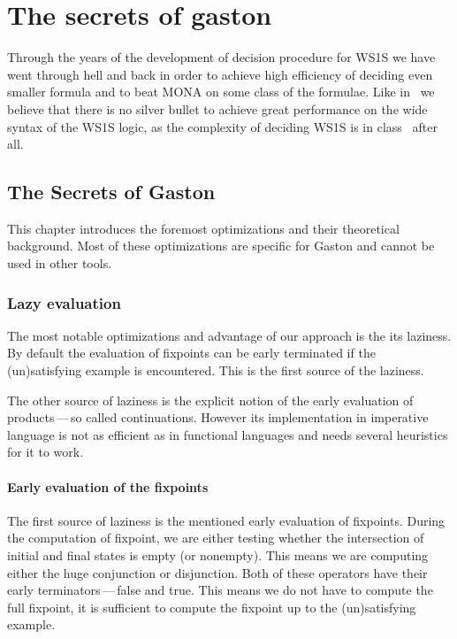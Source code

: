  
\chapter{The secrets of gaston}
\begin{intro}
Through the years of the development of decision procedure for WS1S we 
have went through hell and back in order to achieve high efficiency
of deciding even smaller formula and to beat MONA on some class of the
formulae. Like in~\cite{mona:secrets} we believe that there is no silver
bullet to achieve great performance on the wide syntax of the WS1S logic,
as the complexity of deciding WS1S is in \nonelementary 
class~\cite{ws1s:nonelementary} after all.
\end{intro}

\section{The Secrets of Gaston}

This chapter introduces the foremost optimizations and their theoretical background. Most of these optimizations are specific for
Gaston and cannot be used in other tools. 

  \subsection{Lazy evaluation}
  The most notable optimizations and advantage of our approach is the
  its laziness. By default the evaluation of fixpoints can be early
  terminated if the (un)satisfying example is encountered. This is 
  the first source of the laziness. 
  
  The other source of laziness is the explicit notion of the early
  evaluation of products\,---\,so called continuations. However its
  implementation in imperative language is not as efficient as in
  functional languages and needs several heuristics for it to work.

    \subsubsection{Early evaluation of the fixpoints}      
    
    The first source of laziness is the mentioned early evaluation
    of fixpoints. During the computation of fixpoint, we are either
    testing whether the intersection of initial and final states is
    empty (or nonempty). This means we are computing either the huge
    conjunction or disjunction. Both of these operators have their
    early terminators\,---\,false and true. This means we do not
    have to compute the full fixpoint, it is sufficient to compute
    the fixpoint up to the (un)satisfying example.
    
